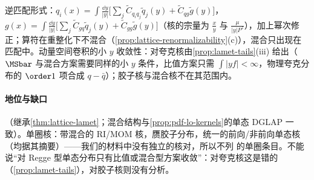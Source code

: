 \begin{proposition}\label{prop:lamet-gluon-singlet}
逆匹配形式\cite{JiEtAl2021}：$q_i(x)=\int\frac{\dd y}{|y|}\big[\sum_j\tilde C_{q_iq_j}\tilde q_j(y)+\tilde C_{qg}\tilde g(y)\big]$，$g(x)=\int\frac{\dd y}{|y|}\big[\sum_j\tilde C_{gq}\tilde q_j(y)+\tilde C_{gg}\tilde g(y)\big]$（核的宗量为 $\frac xy$ 与 $\frac\mu{|y|P^z}$），加上幂次修正；算符在重整化下不混合（\cref{prop:lattice-renormalizability}(c)），混合只出现在匹配中。动量空间卷积的小 $y$ 收敛性：对夸克核由\cref{prop:lamet-tails}(iii) 给出（$\MSbar$ 与混合方案需要同样的小 $y$ 条件，比值方案只需 $\int|yf|<\infty$，物理夸克分布的 $\order1$ 项合成 $q-\bar q$）；胶子核与混合核不在其范围内。
\end{proposition}

\paragraph{地位与缺口}
\tagA（继承\cref{thm:lattice-lamet}；混合结构与\cref{prop:pdf-lo-kernels}的单态 DGLAP 一致）。单圈核：带混合的 RI/MOM 核\cite{Wang:2019tgg}，赝胶子分布\cite{Balitsky:2019krf}，统一的前向/非前向单态核\cite{Yao:2022vtp}（均据其摘要）——我们的材料中没有独立的核对，所以不列 \tagR 的单圈条目。不能说“对 Regge 型单态分布只有比值或混合型方案收敛”：对夸克核这是错的（\cref{prop:lamet-tails}），对胶子核则没有分析。


